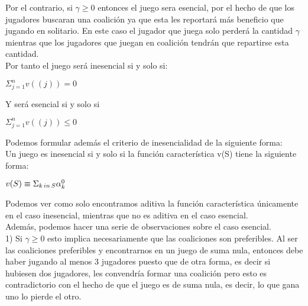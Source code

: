 \documentclass[10pt,a4paper]{book}
\begin{document}
Por el contrario, si $\gamma \geq 0$ entonces el juego sera esencial, por el hecho de que los jugadores buscaran una coalición ya que esta les reportará más beneficio que jugando en solitario. En este caso el jugador que juega solo perderá la cantidad $\gamma$  mientras que los jugadores que juegan en coalición tendrán que repartirse esta cantidad.\\

Por tanto el juego será inesencial si y solo si:\\

\begin{center}

$\Sigma^{n}_{j=1} v((j)) =0 $

\end{center}

Y será esencial si y solo si 

\begin{center}

$\Sigma^{n}_{j=1} v((j)) \leq 0 $

\end{center}

Podemos formular además el criterio de inesencialidad de la siguiente forma:\\
Un juego es inesencial si y solo si la función característica v(S) tiene la siguiente forma:\\

\begin{center}

$v(S) \equiv \Sigma_{k \thinspace  in \thinspace S} \alpha^{0}_{k} $

\end{center}


Podemos ver como solo encontramos aditiva la función característica únicamente en el caso inesencial, mientras que no es aditiva en el caso esencial.\\

Además, podemos hacer una serie de observaciones sobre el caso esencial.\\
1) Si $\gamma \geq 0$ esto implica necesariamente que las coaliciones son preferibles. Al ser las coaliciones preferibles y encontrarnos en un juego de suma nula, entonces debe haber jugando al menos 3 jugadores puesto que de otra forma, es decir si hubiesen dos jugadores, les convendría formar una coalición pero esto es contradictorio con el hecho de que el juego es de suma nula, es decir, lo que gana uno lo pierde el otro.\\
\end{document}
